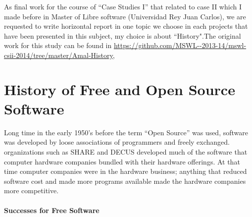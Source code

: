 \documentclass[11pt]{article} %
\begin{document}
As final work for the course of “Case Studies I” that related to case II which I made before in Master of Libre software (Universidad Rey Juan Carlos), we are requested to write horizontal  report in one topic we choose in each projects that have been presented in this subject, my choice is about “History".The original work for this study can be found in  \url{https://github.com/MSWL--2013-14/mswl-csii-2014/tree/master/Amal-History},

\section{History of Free and Open Source Software}

Long time  in the early 1950's before the term “Open Source” was used, software was developed by loose associations of programmers and freely exchanged.  organizations such as SHARE and DECUS developed much of the software that computer hardware companies bundled with their hardware offerings. At that time computer companies were in the hardware business; anything that reduced software cost and made more programs available made the hardware companies more competitive.
\paragraph{Successes for Free Software}
\end{document}
